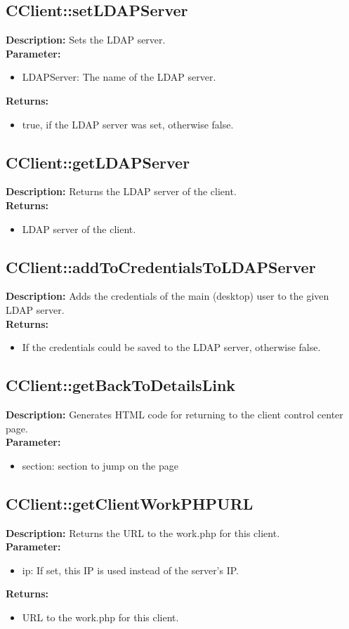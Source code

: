 \subsection{CClient::setLDAPServer}
\textbf{Description:} Sets the LDAP server.\\
\textbf{Parameter:}
\begin{itemize}
\item LDAPServer: The name of the LDAP server.
\end{itemize}
\textbf{Returns:}
\begin{itemize}
\item true, if the LDAP server was set, otherwise false.
\end{itemize}

\subsection{CClient::getLDAPServer}
\textbf{Description:} Returns the LDAP server of the client.\\
\textbf{Returns:}
\begin{itemize}
\item LDAP server of the client.
\end{itemize}

\subsection{CClient::addToCredentialsToLDAPServer}
\textbf{Description:} Adds the credentials of the main (desktop) user to the given LDAP server.\\
\textbf{Returns:}
\begin{itemize}
\item If the credentials could be saved to the LDAP server, otherwise false.
\end{itemize}

\subsection{CClient::getBackToDetailsLink}
\textbf{Description:} Generates HTML code for returning to the client control center page.\\
\textbf{Parameter:}
\begin{itemize}
\item section: section to jump on the page
\end{itemize}

\subsection{CClient::getClientWorkPHPURL}
\textbf{Description:} Returns the URL to the work.php for this client.\\
\textbf{Parameter:}
\begin{itemize}
\item ip: If set, this IP is used instead of the server's IP.
\end{itemize}
\textbf{Returns:}
\begin{itemize}
\item URL to the work.php for this client.
\end{itemize}

